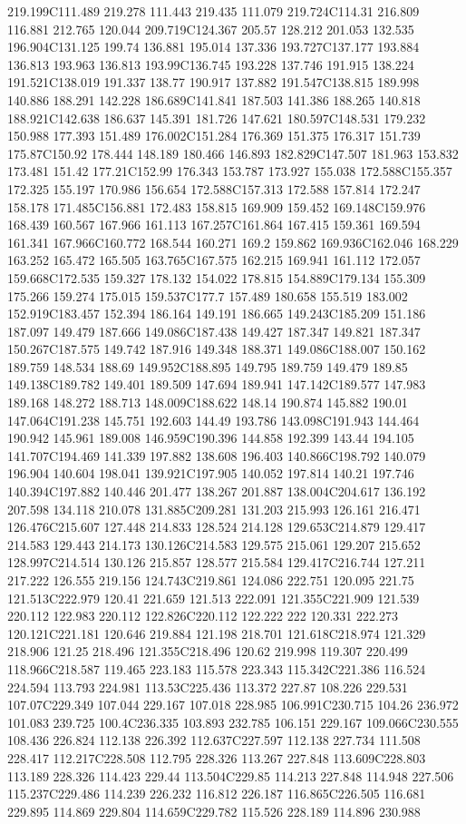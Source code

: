 219.199C111.489 219.278 111.443 219.435 111.079 219.724C114.31 216.809 116.881 212.765 120.044 209.719C124.367 205.57 128.212 201.053 132.535 196.904C131.125 199.74 136.881 195.014 137.336 193.727C137.177 193.884 136.813 193.963 136.813 193.99C136.745 193.228 137.746 191.915 138.224 191.521C138.019 191.337 138.77 190.917 137.882 191.547C138.815 189.998 140.886 188.291 142.228 186.689C141.841 187.503 141.386 188.265 140.818 188.921C142.638 186.637 145.391 181.726 147.621 180.597C148.531 179.232 150.988 177.393 151.489 176.002C151.284 176.369 151.375 176.317 151.739 175.87C150.92 178.444 148.189 180.466 146.893 182.829C147.507 181.963 153.832 173.481 151.42 177.21C152.99 176.343 153.787 173.927 155.038 172.588C155.357 172.325 155.197 170.986 156.654 172.588C157.313 172.588 157.814 172.247 158.178 171.485C156.881 172.483 158.815 169.909 159.452 169.148C159.976 168.439 160.567 167.966 161.113 167.257C161.864 167.415 159.361 169.594 161.341 167.966C160.772 168.544 160.271 169.2 159.862 169.936C162.046 168.229 163.252 165.472 165.505 163.765C167.575 162.215 169.941 161.112 172.057 159.668C172.535 159.327 178.132 154.022 178.815 154.889C179.134 155.309 175.266 159.274 175.015 159.537C177.7 157.489 180.658 155.519 183.002 152.919C183.457 152.394 186.164 149.191 186.665 149.243C185.209 151.186 187.097 149.479 187.666 149.086C187.438 149.427 187.347 149.821 187.347 150.267C187.575 149.742 187.916 149.348 188.371 149.086C188.007 150.162 189.759 148.534 188.69 149.952C188.895 149.795 189.759 149.479 189.85 149.138C189.782 149.401 189.509 147.694 189.941 147.142C189.577 147.983 189.168 148.272 188.713 148.009C188.622 148.14 190.874 145.882 190.01 147.064C191.238 145.751 192.603 144.49 193.786 143.098C191.943 144.464 190.942 145.961 189.008 146.959C190.396 144.858 192.399 143.44 194.105 141.707C194.469 141.339 197.882 138.608 196.403 140.866C198.792 140.079 196.904 140.604 198.041 139.921C197.905 140.052 197.814 140.21 197.746 140.394C197.882 140.446 201.477 138.267 201.887 138.004C204.617 136.192 207.598 134.118 210.078 131.885C209.281 131.203 215.993 126.161 216.471 126.476C215.607 127.448 214.833 128.524 214.128 129.653C214.879 129.417 214.583 129.443 214.173 130.126C214.583 129.575 215.061 129.207 215.652 128.997C214.514 130.126 215.857 128.577 215.584 129.417C216.744 127.211 217.222 126.555 219.156 124.743C219.861 124.086 222.751 120.095 221.75 121.513C222.979 120.41 221.659 121.513 222.091 121.355C221.909 121.539 220.112 122.983 220.112 122.826C220.112 122.222 222 120.331 222.273 120.121C221.181 120.646 219.884 121.198 218.701 121.618C218.974 121.329 218.906 121.25 218.496 121.355C218.496 120.62 219.998 119.307 220.499 118.966C218.587 119.465 223.183 115.578 223.343 115.342C221.386 116.524 224.594 113.793 224.981 113.53C225.436 113.372 227.87 108.226 229.531 107.07C229.349 107.044 229.167 107.018 228.985 106.991C230.715 104.26 236.972 101.083 239.725 100.4C236.335 103.893 232.785 106.151 229.167 109.066C230.555 108.436 226.824 112.138 226.392 112.637C227.597 112.138 227.734 111.508 228.417 112.217C228.508 112.795 228.326 113.267 227.848 113.609C228.803 113.189 228.326 114.423 229.44 113.504C229.85 114.213 227.848 114.948 227.506 115.237C229.486 114.239 226.232 116.812 226.187 116.865C226.505 116.681 229.895 114.869 229.804 114.659C229.782 115.526 228.189 114.896 230.988 